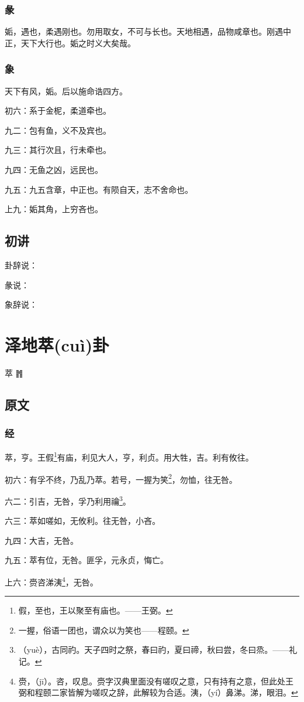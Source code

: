 \documentclass[12pt,oneside]{book}
\begin{document}
\subsection{彖}
姤，遇也，柔遇刚也。勿用取女，不可与长也。天地相遇，品物咸章也。刚遇中正，天下大行也。姤之时义大矣哉。

\subsection{象}
天下有风，姤。后以施命诰四方。

初六：系于金柅，柔道牵也。

九二：包有鱼，义不及宾也。

九三：其行次且，行未牵也。

九四：无鱼之凶，远民也。

九五：九五含章，中正也。有陨自天，志不舍命也。

上九：姤其角，上穷吝也。


\section{初讲}
卦辞说：

彖说：

象辞说：


\chapter{泽地萃(cuì)卦}
萃 {\Large ䷬}
\section{原文}

\subsection{经}
萃，亨。王假\footnote{假，至也，王以聚至有庙也。——王弼。}有庙，利见大人，亨，利贞。用大牲，吉。利有攸往。

初六：有孚不终，乃乱乃萃。若号，一握为笑\footnote{一握，俗语一团也，谓众以为笑也——程颐。}，勿恤，往无咎。

六二：引吉，无咎，孚乃利用禴\footnote{（yuè），古同礿。天子四时之祭，春曰礿，夏曰禘，秋曰尝，冬曰烝。——礼记。}。

六三：萃如嗟如，无攸利。往无咎，小吝。

九四：大吉，无咎。

九五：萃有位，无咎。匪孚，元永贞，悔亡。

上六：赍咨涕洟\footnote{赍，（jī）。咨，叹息。赍字汉典里面没有嗟叹之意，只有持有之意，但此处王弼和程颐二家皆解为嗟叹之辞，此解较为合适。洟，（yí）鼻涕。涕，眼泪。}，无咎。
\end{document}
